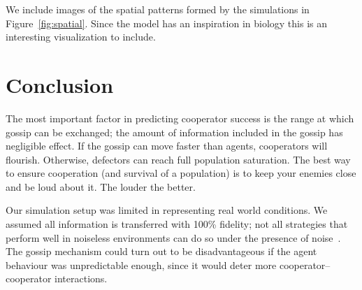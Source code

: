 \documentclass[runningheads]{llncs}
\begin{document}
We include images of the spatial patterns formed by the simulations in Figure~\ref{fig:spatial}.
Since the model has an inspiration in biology this is an interesting visualization to include.
%
%
%
\section{Conclusion}
The most important factor in predicting cooperator success is the range at which gossip can be exchanged; the amount of information included in the gossip has negligible effect.
If the gossip can move faster than agents, cooperators will flourish. Otherwise, defectors can reach full population saturation.
The best way to ensure cooperation (and survival of a population) is to keep your enemies close and be loud about it. The louder the better.

Our simulation setup was limited in representing real world conditions.
We assumed all information is transferred with 100\% fidelity;
not all strategies that perform well in noiseless environments can do so under the presence of noise~\cite{noise}.
The gossip mechanism could turn out to be disadvantageous if the agent behaviour was unpredictable enough, since it would deter more cooperator--cooperator interactions.
%
%
%
%

\end{document}
